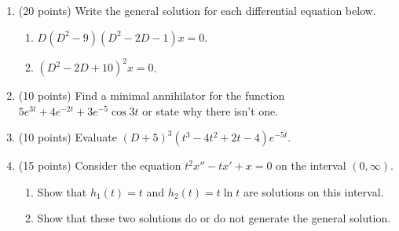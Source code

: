 \documentclass{article}
\begin{document}
\begin{enumerate}
\item (20 points)  Write the general solution for each differential
  equation below.
  \begin{enumerate}
  \item $D(D^2 -9) (D^2 -2D-1) x = 0$.
  \item $(D^2 -2D + 10)^2 x = 0$.
  \end{enumerate}

\item (10 points) Find a minimal annihilator for the function
    $5 e^{3t} + 4 e^{-2t} + 3 e^{-5}\cos 3t$ or state why there isn't
    one.
  \item (10 points) Evaluate $(D+5)^3 (t^3 - 4t^2 + 2t -4) e^{-5t}$.
  
  \item (15 points) Consider the equation $t^2 x'' - t x' + x =0$ on
    the interval $(0, \infty)$.
    \begin{enumerate}
      \item Show that $h_1(t) = t$ and $h_2(t) = t \ln t$ are
        solutions on this interval.
        \item Show that these two solutions do or do not generate the
          general solution.
        \end{enumerate}

      \end{enumerate}

      
\end{document}
